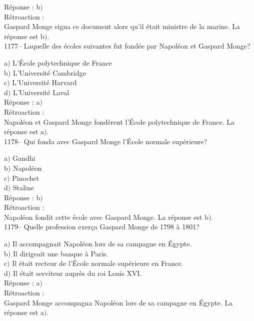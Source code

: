 ﻿\documentclass[letterpaper, 12pt]{article}
\begin{document}
R\'eponse : b$)$\\

R\'etroaction : \\
Gaspard Monge signa ce document alors qu'il \'etait ministre de la
marine.
La r\'eponse est b$)$.\\

1177-- Laquelle des \'ecoles suivantes fut fond\'ee par Napol\'eon
et Gaspard Monge?

a$)$ L'\'Ecole polytechnique de France \\
b$)$ L'Universit\'e Cambridge \\
c$)$ L'Universit\'e Harvard \\
d$)$ L'Universit\'e Laval\\

R\'eponse : a$)$\\

R\'etroaction : \\
Napol\'eon et Gaspard Monge fond\`erent l'\'Ecole polytechnique de
France.
La r\'eponse est a$)$.\\

1178-- Qui fonda avec Gaspard Monge l'\'Ecole normale sup\'erieure?

a$)$ Gandhi \\
b$)$ Napol\'eon \\
c$)$ Pinochet \\
d$)$ Staline\\

R\'eponse : b$)$\\

R\'etroaction : \\
Napol\'eon fondit cette \'ecole avec Gaspard Monge.
La r\'eponse est b$)$.\\

1179-- Quelle profession exer\c ca Gaspard Monge de 1798 \`a 1801?

a$)$ Il accompagnait Napol\'eon lors de sa campagne en \'Egypte. \\
b$)$ Il dirigeait une banque \`a Paris. \\
c$)$ Il \'etait recteur de l'\'Ecole normale sup\'erieure en France. \\
d$)$ Il \'etait serviteur aupr\`es du roi Louis XVI. \\

R\'eponse : a$)$\\

R\'etroaction : \\
Gaspard Monge accompagna Napol\'eon lors de sa campagne en \'Egypte.
La r\'eponse est a$)$.\\
\end{document}
